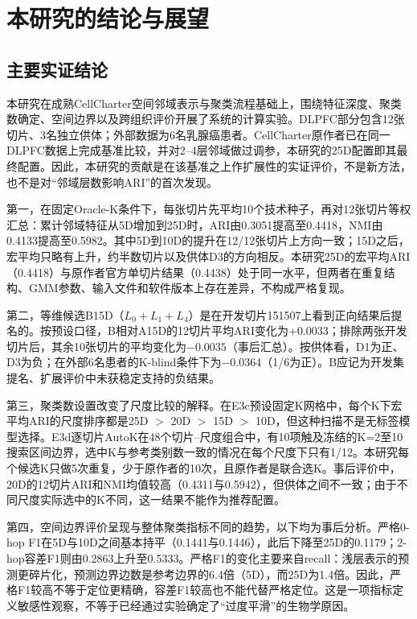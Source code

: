 \section{本研究的结论与展望}
\label{sec:cc-conclusion-module-v1}

\subsection{主要实证结论}
本研究在成熟CellCharter空间邻域表示与聚类流程基础上，围绕特征深度、聚类数确定、空间边界以及跨组织评价开展了系统的计算实验。DLPFC部分包含12张切片、3名独立供体；外部数据为6名乳腺癌患者。CellCharter原作者已在同一DLPFC数据上完成基准比较，并对2--4层邻域做过调参\cite{varrone2024,cellcharteranalyses2024}，本研究的25D配置即其最终配置。因此，本研究的贡献是在该基准之上作扩展性的实证评价，不是新方法，也不是对“邻域层数影响ARI”的首次发现。

第一，在固定Oracle-K条件下，每张切片先平均10个技术种子，再对12张切片等权汇总：累计邻域特征从5D增加到25D时，ARI由0.3051提高至0.4418，NMI由0.4133提高至0.5982。其中5D到10D的提升在12/12张切片上方向一致；15D之后，宏平均只略有上升，约半数切片以及供体D3的方向相反。本研究25D的宏平均ARI（0.4418）与原作者官方单切片结果（0.4438）处于同一水平，但两者在重复结构、GMM参数、输入文件和软件版本上存在差异，不构成严格复现。

第二，等维候选B15D（$L_0+L_1+L_4$）是在开发切片151507上看到正向结果后提名的。按预设口径，B相对A15D的12切片平均ARI变化为$+0.0033$；排除两张开发切片后，其余10张切片的平均变化为$-0.0035$（事后汇总）。按供体看，D1为正、D3为负；在外部6名患者的K-blind条件下为$-0.0364$（1/6为正）。B应记为开发集提名、扩展评价中未获稳定支持的负结果。

第三，聚类数设置改变了尺度比较的解释。在E3c预设固定K网格中，每个K下宏平均ARI的尺度排序都是25D $>$ 20D $>$ 15D $>$ 10D，但这种扫描不是无标签模型选择。E3d逐切片AutoK在48个切片--尺度组合中，有10项触及冻结的K=2至10搜索区间边界，选中K与参考类别数一致的情况在每个尺度下只有1/12。本研究每个候选K只做5次重复，少于原作者的10次，且原作者是联合选K。事后评价中，20D的12切片ARI和NMI均值较高（0.4311与0.5942），但供体之间不一致；由于不同尺度实际选中的K不同，这一结果不能作为推荐配置。

第四，空间边界评价呈现与整体聚类指标不同的趋势，以下均为事后分析。严格0-hop F1在5D与10D之间基本持平（0.1441与0.1446），此后下降至25D的0.1179；2-hop容差F1则由0.2863上升至0.5333。严格F1的变化主要来自recall：浅层表示的预测更碎片化，预测边界边数是参考边界的6.4倍（5D），而25D为1.4倍。因此，严格F1较高不等于定位更精确，容差F1较高也不能代替严格定位。这是一项指标定义敏感性观察，不等于已经通过实验确定了“过度平滑”的生物学原因。

